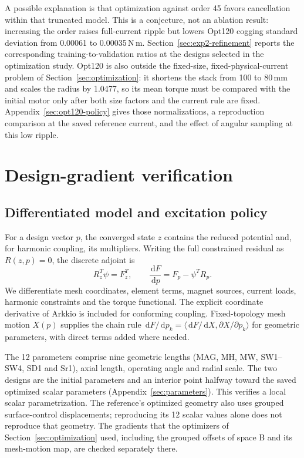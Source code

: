 \documentclass{anvil-paper}
\newcommand{\dd}{\,\mathrm{d}}
\begin{document}
A possible explanation is that optimization against order 45 favors
cancellation within that truncated model. This is a conjecture, not an
ablation result: increasing the order raises full-current ripple but
lowers Opt120 cogging standard deviation from 0.00061 to 0.00035\,N\,m.
Section~\ref{sec:exp2-refinement} reports the corresponding training-to-validation
ratios at the designs selected in the optimization study.
Opt120 is also outside the fixed-size, fixed-physical-current problem of
Section~\ref{sec:optimization}: it shortens the stack from 100 to 80\,mm and
scales the radius by 1.0477, so its mean torque must be compared with the
initial motor only after both size factors and the current rule are fixed.
Appendix~\ref{sec:opt120-policy} gives those normalizations, a reproduction
comparison at the saved reference current, and the effect of angular
sampling at this low ripple.

\section{Design-gradient verification}\label{sec:gradients}
\subsection{Differentiated model and excitation policy}
For a design vector $p$, the converged state $z$ contains the reduced
potential and, for harmonic coupling, its multipliers. Writing the full
constrained residual as $R(z,p)=0$, the discrete adjoint is
\begin{equation}
 R_z^T\psi=F_z^T,\qquad
 \frac{\dd F}{\dd p}=F_p-\psi^T R_p.
 \label{eq:adjoint}
\end{equation}
We differentiate mesh coordinates, element terms, magnet sources, current
loads, harmonic constraints and the torque functional. The explicit
coordinate derivative of Arkkio is included for conforming coupling.
Fixed-topology mesh motion $X(p)$ supplies the chain rule
$\dd F/\dd p_k=\langle\dd F/\dd X,\partial X/\partial p_k\rangle$
for geometric parameters, with direct terms added where needed.

The 12 parameters comprise nine geometric lengths (MAG, MH, MW,
SW1--SW4, SD1 and Sr1), axial length, operating angle and radial scale.
The two designs are the initial parameters and an interior point halfway
toward the saved optimized scalar parameters
(Appendix~\ref{sec:parameters}). This verifies a local scalar
parametrization. The reference's optimized geometry also uses grouped
surface-control displacements; reproducing its 12 scalar values alone
does not reproduce that geometry. The gradients that the optimizers of
Section~\ref{sec:optimization} used, including the grouped offsets of space B
and its mesh-motion map, are checked separately there.
\end{document}
